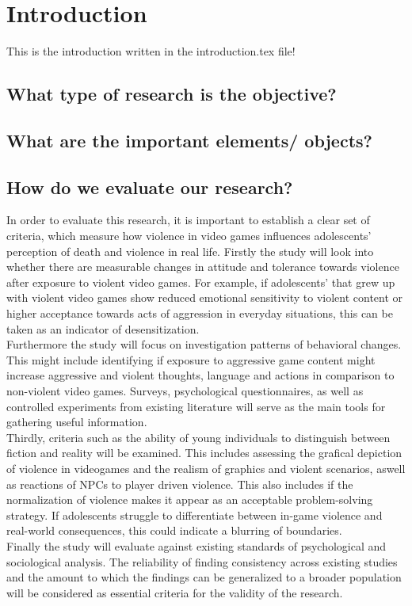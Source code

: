 \section{Introduction}
This is the introduction written in the introduction.tex file!

\subsection{What type of research is the objective?}

\subsection{What are the important elements/ objects?}

\subsection{How do we evaluate our research?}

In order to evaluate this research, it is important to establish a clear set of criteria, 
which measure how violence in video games influences adolescents' perception of death and violence in real life.
Firstly the study will look into whether there are measurable changes in attitude and tolerance towards violence after exposure to violent
video games. For example, if adolescents' that grew up with violent video games show reduced emotional sensitivity to violent content
or higher acceptance towards acts of aggression in everyday situations, this can be taken as an indicator of desensitization. \\
Furthermore the study will focus on investigation patterns of behavioral changes. This might include identifying if exposure to aggressive 
game content might increase aggressive and violent thoughts, language and actions in comparison to non-violent video games. Surveys, 
psychological questionnaires, as well as controlled experiments from existing literature will serve as the main tools for gathering useful information. \\
Thirdly, criteria such as the ability of young individuals to distinguish between fiction and reality will be examined. This includes assessing
the grafical depiction of violence in videogames and the realism of graphics and violent scenarios, aswell as reactions of NPCs to player driven violence.
This also includes if the normalization of violence makes it appear as an acceptable problem-solving strategy. If adolescents struggle to
differentiate between in-game violence and real-world consequences, this could indicate a blurring of boundaries. \\
Finally the study will evaluate against existing standards of psychological and sociological analysis. The reliability of finding consistency across
existing studies and the amount to which the findings can be generalized to a broader population will be considered as essential criteria for the
validity of the research.

